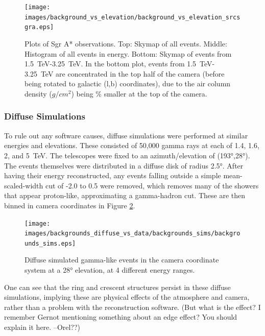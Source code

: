   \begin{figure}[ht]
    \centering
    \texttt{[image: images/background\_vs\_elevation/background\_vs\_elevation\_srcsgra.eps]}
    \caption[Background Vs Elevation Sgr A*]
    {\small 
      Plots of Sgr A* observations.
      Top: Skymap of all events.  Middle: Histogram of all events in energy.  Bottom: Skymap of events from \SI{1.5}{\TeV}-\SI{3.25}{\TeV}.  
      In the bottom plot, events from \SI{1.5}{\TeV}-\SI{3.25}{\TeV} are concentrated in the top half of the camera (before being rotated to galactic (l,b) coordinates), due to the air column density ($g/cm^2$) being \% smaller at the top of the camera.
    }
    \label{fig:bkgvsel_sgra}
  \end{figure}

  

  \subsubsection{Diffuse Simulations}\label{subsubsec:diffusesims}
    To rule out any software causes, diffuse simulations were performed at similar energies and elevations.
    These consisted of 50,000 gamma rays at each of 1.4, 1.6, 2, and \SI{5}{\TeV}.
    The telescopes were fixed to an azimuth/elevation of (\ang{193},\ang{28}).
    The events themselves were distributed in a diffuse disk of radius \ang{2.5}.
    After having their energy reconstructed, any events falling outside a simple mean-scaled-width cut of -2.0 to 0.5 were removed, which removes many of the showers that appear proton-like, approximating a gamma-hadron cut.
    These are then binned in camera coordinates in Figure \ref{fig:back_simdiffuse}.


    \begin{figure}[ht]
      \centering
      \texttt{[image: images/backgrounds\_diffuse\_vs\_data/backgrounds\_sims/backgrounds\_sims.eps]}
      \caption[Diffuse Simulated Backgrounds]{
        Diffuse simulated gamma-like events in the camera coordinate system at a \ang{28} elevation, at 4 different energy ranges.
      }
      \label{fig:back_simdiffuse}
    \end{figure}

    One can see that the ring and crescent structures persist in these diffuse simulations, implying these are physical effects of the atmosphere and camera, rather than a problem with the reconstruction software.
    (But what is the effect? I remember Gernot mentioning something about an edge effect? You should explain it here. --Orel??)

